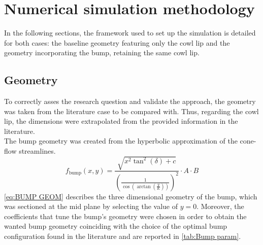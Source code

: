\documentclass[11pt,a4paper]{article}
\begin{document}
\section{Numerical simulation methodology}
\label{sec:eqs}

In the following sections, the framework used to set up the simulation is detailed for both cases: the baseline geometry featuring only the cowl lip and the geometry incorporating the bump, retaining the same cowl lip.
\subsection{Geometry}
\label{sec:geom}
To correctly asses the research question and validate the approach, the geometry was taken from the literature case to be compared with. Thus, regarding the cowl lip, the dimensions were extrapolated from the provided information in the literature\cite{AroMontes}.\\
The bump geometry was created from the hyperbolic approximation of the cone-flow streamlines\cite{BUMPGEOM}.
\begin{equation}
f_\text{bump}(x,y) = \frac{\sqrt{x^2 \tan^2(\delta) + c}}{\left(\frac{1}{\cos(\arctan(\frac{y}{K}))}\right)^2} \cdot A \cdot B
\label{eq:BUMP GEOM}
\end{equation}
\autoref{eq:BUMP GEOM} describes the three dimensional geometry of the bump, which was sectioned at the mid plane by selecting the value of $y=0$. Moreover, the coefficients that tune the bump's geometry were chosen in order to obtain the wanted bump geometry coinciding with the choice of the optimal bump configuration found in the literature and are reported in \autoref{tab:Bump param}\cite{TEXT01}.
\end{document}
